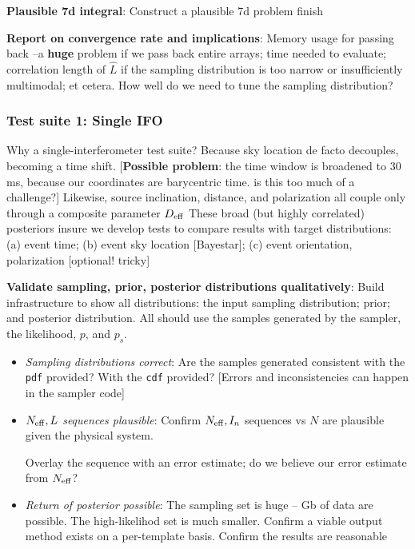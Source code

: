\documentclass[twocolumn,prd,nofootinbib]{revtex4}
\newcommand\editremark[1]{{\color{red} #1}}
\begin{document}
\begin{widetext}
\noindent \textbf{Plausible 7d integral}: Construct a plausible 7d problem \editremark{finish}


\noindent \textbf{Report on convergence rate and implications}: Memory usage for passing back --a \textbf{huge} problem
if we pass back entire arrays; time needed to evaluate;
correlation length of $\hat{L}$ if the sampling distribution is too narrow or insufficiently multimodal; et cetera.  How well do we need to tune the sampling distribution?




\subsubsection{Test suite 1: Single IFO}

Why a single-interferometer test suite?  Because sky location de facto decouples, becoming a time
shift. [\textbf{Possible problem}: the time window is broadened to 30 ms, because our coordinates are barycentric
  time. \editremark{is this too much of a challenge?}] 
Likewise, source inclination, distance, and polarization all couple only through a composite parameter $D_{\rm eff}$
%
These broad (but highly correlated) posteriors insure we develop tests to compare results with target distributions: (a) event time; (b) event sky location [Bayestar]; (c)
event orientation, polarization [optional! tricky]


\noindent \textbf{Validate sampling, prior, posterior distributions qualitatively}: Build infrastructure to show all distributions:
the input sampling distribution; prior; and posterior distribution.  All should use the samples generated by the
sampler, the likelihood, $p$, and $p_s$.
\begin{itemize}
\item \emph{Sampling distributions correct}: Are the samples generated consistent with the \texttt{pdf} provided? With
  the \texttt{cdf} provided?  [Errors and inconsistencies can happen in the sampler code]

\item \emph{$N_{\rm eff},L$ sequences plausible}: Confirm $N_{\rm eff},I_n$ sequences vs $N$ are plausible given the
  physical system.

Overlay the sequence with an error estimate; do we believe our error estimate from $N_{\rm eff}$?

\item \emph{Return of posterior possible}: The sampling set is huge -- Gb of data are possible.   The high-likelihod set
  is much smaller.   Confirm a viable output method exists on a per-template basis.  Confirm the results are reasonable


\end{itemize}
\end{widetext}
\end{document}
